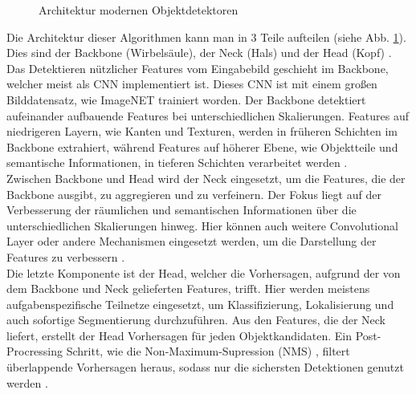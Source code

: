 {{\begin{figure}[h]
		\caption[Architektur modernen Objektdetektoren]{Architektur modernen Objektdetektoren \citep{Terven2023}}
		\label{YOLO_obj_det_gen}
	\end{figure}
	Die Architektur dieser Algorithmen kann man in 3 Teile aufteilen (siehe Abb. \ref{YOLO_obj_det_gen}). Dies sind der Backbone (Wirbelsäule), der Neck (Hals) und der Head (Kopf) \citep{Terven2023}. \\
	Das Detektieren nützlicher Features vom Eingabebild geschieht im Backbone, welcher meist als CNN implementiert ist. Dieses CNN ist mit einem großen Bilddatensatz, wie ImageNET trainiert worden. Der Backbone detektiert aufeinander aufbauende Features bei unterschiedlichen Skalierungen. Features auf niedrigeren Layern, wie Kanten und Texturen, werden in früheren Schichten im Backbone extrahiert, während Features auf höherer Ebene, wie Objektteile und semantische Informationen, in tieferen Schichten verarbeitet werden \citep{Terven2023}. \\
	Zwischen Backbone und Head wird der Neck eingesetzt, um die Features, die der Backbone ausgibt, zu aggregieren und zu verfeinern. Der Fokus liegt auf der Verbesserung der räumlichen und semantischen Informationen über die unterschiedlichen Skalierungen hinweg. Hier können auch weitere Convolutional Layer oder andere Mechanismen   eingesetzt werden, um die Darstellung der Features zu verbessern \citep{Terven2023}. \\
	Die letzte Komponente ist der Head, welcher die Vorhersagen, aufgrund der von dem Backbone und Neck gelieferten Features, trifft. Hier werden meistens aufgabenspezifische Teilnetze eingesetzt, um Klassifizierung, Lokalisierung und auch sofortige Segmentierung durchzuführen. Aus den Features, die der Neck liefert, erstellt der Head Vorhersagen für jeden Objektkandidaten. Ein Post-Procressing Schritt, wie die Non-Maximum-Supression (NMS) , filtert überlappende Vorhersagen heraus, sodass nur die sichersten Detektionen genutzt werden \citep{Terven2023}.\\
	\begin{figure}[h]
		\centering

\end{figure}}}
